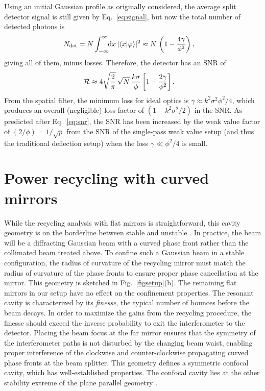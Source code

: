 Using an initial Gaussian profile as originally considered, the average split detector signal 
is still given by Eq.~\eqref{eq:signal}, but now
the total number of detected photons is
\begin{align}
  N_{\rm det} &= N\int_{-\infty}^{\infty}\!\! \text{d}x\, |\langle x \vert \varphi \rangle|^2 \approx N\,\left(1 - \frac{4\gamma}{\phi^2}\right), 
\end{align}
giving all of them, minus losses.
Therefore, the detector has an SNR of
\begin{align}\label{eq:snrresult}
  {\cal R} &\approx 4\sqrt{\frac{2}{\pi}}\,\sqrt{N}\,\frac{k\sigma}{\phi}\left[1 - \frac{2\gamma}{\phi^2}\right].  
\end{align}
From the spatial filter, the minimum loss for ideal optics is $\gamma \approx k^2\sigma^2\phi^2/4$, which produces an overall (negligible) loss factor of $(1 - k^2\sigma^2/2)$ in the SNR.
As predicted after Eq.~\eqref{eq:snr}, the SNR has been increased by the weak value factor of $(2/\phi) = 1/\sqrt{p}$ from the SNR of the single-pass weak value setup (and thus the traditional deflection setup) when the loss $\gamma \ll \phi^2/4$ is small. 


\section{Power recycling with curved mirrors}
While the recycling analysis with flat mirrors is straightforward, this cavity geometry is on the borderline between stable and unstable \cite{Milonni2010}.
In practice, the beam will be a diffracting Gaussian beam with a curved phase front rather than the collimated beam treated above.  To confine such a Gaussian beam in a stable configuration, the radius of curvature of the recycling mirror must match the radius of curvature of the phase fronts to ensure proper phase cancellation at the mirror. This geometry is sketched in Fig.~\ref{figsetup}(b). The remaining flat mirrors in our setup have no effect on the confinement properties. The resonant cavity is characterized by its {\it finesse}, the typical number of bounces before the beam decays.  In order to maximize the gains from the recycling procedure, the finesse should exceed the inverse probability to exit the interferometer to the detector.
Placing the beam focus at the far mirror ensures that the symmetry of the interferometer paths is not disturbed by the changing beam waist, enabling proper interference of the clockwise and counter-clockwise propagating curved phase fronts at the beam splitter.  This geometry defines a symmetric confocal cavity, which has well-established properties.  The confocal cavity lies at the other stability extreme of the plane parallel geometry \cite{Milonni2010}.

